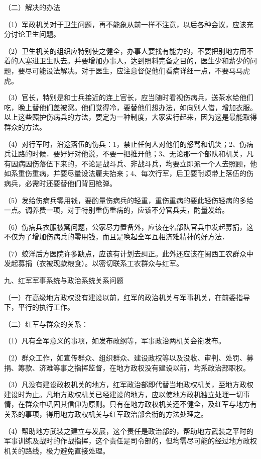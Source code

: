 （二）解决的办法

（1）军政机关对于卫生问题，再不能象从前一样不注意，以后各种会议，应该充分讨论卫生问题。

（2）卫生机关的组织应特别使之健全，办事人要找有能力的，不要把别地方用不着的人塞进卫生队去。并要增加办事人，达到照料完备之目的，医生少和薪少的问题，要尽可能设法解决。对于医生，应注意督促他们看病详细一点，不要马马虎虎。

（3）官长，特别是和士兵接近的连上官长，应当随时看视伤病兵，送茶水给他们吃，晚上替他们盖被窝。他们觉得冷，要替他们想办法，如向别人借，增加衣服。以上这些照护伤病兵的方法，要定为一种制度，大家实行起来，因为这是最能取得群众的方法。

（4）对行军时，沿途落伍的伤兵：1，禁止任何人对他们的怒骂和讥笑；2、伤病兵让路的时候．要好好对他说，不要一把推开他；3、无论那一个部队和机关，凡有因病因伤落伍下来的，不论是战斗兵、非战斗兵，均要立即派一个人去照顾，他如系重伤重病，并要尽量设法雇夫抬来；4、每次行军，后卫要耐烦带上落伍的伤病兵，必需时还要替他们背回枪弹。

（5）发给伤病兵零用钱，要酌量伤病兵的轻重，重伤重病的要此轻伤轻病的多给一点。调养费一项，对于特别重伤重病的，应该不分官兵夫，酌量发给。

（6）伤病兵衣服被窝问题，公家尽力置备外，应该在名部队官兵中发起募捐，这不仅为了增加伤病兵的零用钱，而且是唤起全军互相济难精神的好方法．

（7）蛟洋后方医院许多缺点，应该有计划去纠正。此外还应该在闽西工农群众中发起募捐（衣被现款粮食）。以密切联系工农群众与红军。

九、红军军事系统与政治系统关系问题

（一）在高级地方政权没有建设以前，红军的政治机关与军事机关，在前委指导下，平行的执行工作。

（二）红军与群众的关系：

（1）凡有全军意义的事项，如发布政纲等，军事政治两机关会衔发布。

（2）群众工作，如宣传群众、组织群众、建设政权等以及没收、审判、处罚、募捐、筹款、济难等事之指挥监督，在地方政权没有建设以前，均系政治部职权。

（3）凡没有建设政权机关的地方，红军政治部即代替当地政权机关，至地方政权建设时为止。凡地方政权机关已经建设的地方，应以使地方政机独立处理一切事情，在群众中巩固其信仰为原则。只有在地方政权机关还不健全，及红军与地方有关系的事项，得用地方政权机关与红军政治部会衔的方法处理之。

（4）帮助地方武装之建立与发展，这个责任是政治部的，帮助地方武装之平时的军事训练及战时的作战指挥，这个责任是司令部的，但均需尽可能的经过地方政权机关的路线，极力避免直接处理。

